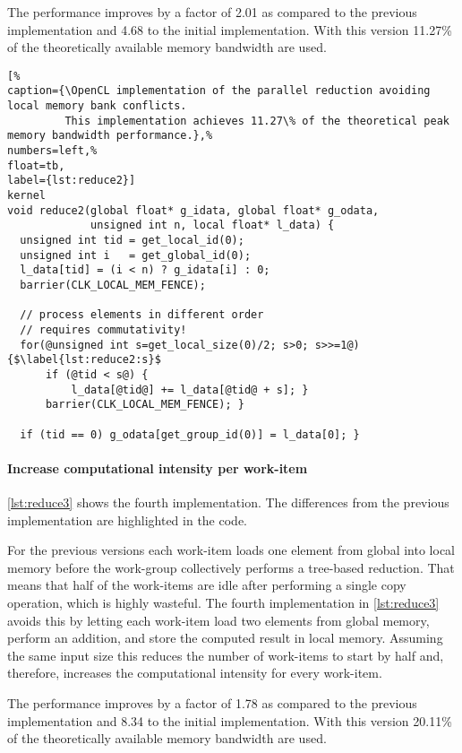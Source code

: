 The performance improves by a factor of 2.01 as compared to the previous implementation and 4.68 to the initial implementation.
With this version 11.27\% of the theoretically available memory bandwidth are used.


\begin{lstlisting}[%                                                             
caption={\OpenCL implementation of the parallel reduction avoiding local memory bank conflicts.
         This implementation achieves 11.27\% of the theoretical peak memory bandwidth performance.},%
numbers=left,%
float=tb,
label={lst:reduce2}]
kernel
void reduce2(global float* g_idata, global float* g_odata,
             unsigned int n, local float* l_data) {
  unsigned int tid = get_local_id(0);
  unsigned int i   = get_global_id(0);
  l_data[tid] = (i < n) ? g_idata[i] : 0;
  barrier(CLK_LOCAL_MEM_FENCE);

  // process elements in different order
  // requires commutativity!
  for(@unsigned int s=get_local_size(0)/2; s>0; s>>=1@) {$\label{lst:reduce2:s}$
      if (@tid < s@) {
          l_data[@tid@] += l_data[@tid@ + s]; }
      barrier(CLK_LOCAL_MEM_FENCE); }

  if (tid == 0) g_odata[get_group_id(0)] = l_data[0]; }
\end{lstlisting}

\paragraph{Increase computational intensity per work-item}

\autoref{lst:reduce3} shows the fourth implementation.
The differences from the previous implementation are highlighted in the code.

For the previous versions each work-item loads one element from global into local memory before the work-group collectively performs a tree-based reduction.
That means that half of the work-items are idle after performing a single copy operation, which is highly wasteful.
The fourth implementation in \autoref{lst:reduce3} avoids this by letting each work-item load two elements from global memory, perform an addition, and store the computed result in local memory.
Assuming the same input size this reduces the number of work-items to start by half and, therefore, increases the computational intensity for every work-item.

The performance improves by a factor of 1.78 as compared to the previous implementation and 8.34 to the initial implementation.
With this version 20.11\% of the theoretically available memory bandwidth are used.


